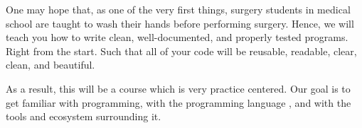 One may  hope that, as one of the very first things, surgery students in medical school are taught to wash their hands before performing surgery.
Hence, we will teach you how to write clean, well-documented, and properly tested programs.
Right from the start.
Such that all of your code will be reusable, readable, clear, clean, and beautiful.

As a result, this will be a course which is very practice centered.
Our goal is to get familiar with programming, with the programming language \python, and with the tools and ecosystem surrounding it.%
%
\endhsection\endhsection%
%
